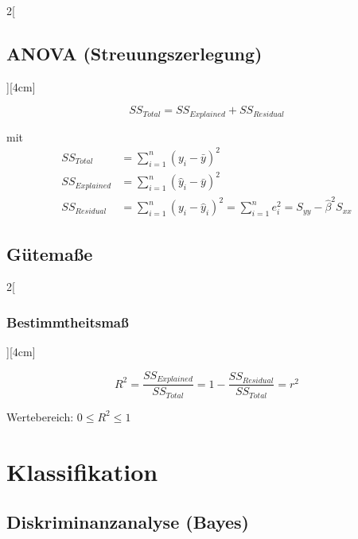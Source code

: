 \documentclass[8pt]{extarticle}
\begin{document}
\begin{multicols}{2}[\subsection{ANOVA (Streuungszerlegung)}][4cm]

$$SS_{Total}=SS_{Explained}+SS_{Residual}$$

mit
\begin{align*}
SS_{Total}  &=  \sum\limits_{i=1}^n(y_i-\bar{y})^2 \\
SS_{Explained} &= \sum\limits_{i=1}^n(\hat{y}_i-\bar{y})^2 \\
SS_{Residual} &= \sum\limits_{i=1}^n(y_i-\hat{y}_i)^2=\sum\limits_{i=1}^n e_i^2=S_{yy}-\hat{\beta}^2S_{xx} 
\end{align*}

\end{multicols}

\subsection{Gütemaße}

\begin{multicols}{2}[\subsubsection{Bestimmtheitsmaß}][4cm]

$$R^2=\frac{SS_{Explained}}{SS_{Total}}=1-\frac{SS_{Residual}}{SS_{Total}}=r^2$$

Wertebereich: $0 \le R^2 \le 1$

\end{multicols}




\section{Klassifikation}

\subsection{Diskriminanzanalyse (Bayes)}


\end{document}
